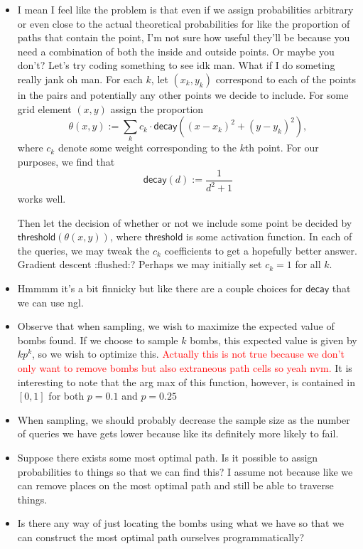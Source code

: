 \documentclass[a4paper, 12pt]{article}
\begin{document}
\begin{itemize}
    \item I mean I feel like the problem is that even if we assign probabilities arbitrary or even close to the actual theoretical probabilities for like the proportion of paths that contain the point, I'm not sure how useful they'll be because you need a combination of both the inside and outside points. Or maybe you don't? Let's try coding something to see idk man. What if I do someting really jank oh man. For each \( k \), let \( (x_k, y_k) \) correspond to each of the points in the pairs and potentially any other points we decide to include. For some grid element \( (x, y) \) assign the proportion
        \[
            \theta (x, y) := \sum_{k} c_k \cdot \textsf{decay}\left( (x - x_k)^2 + (y - y_k)^2 \right)
        ,\]
        where \( c_k \) denote some weight corresponding to the \( k \)th point. For our purposes, we find that
        \[
            \textsf{decay}(d) := \frac{1}{d^2 + 1}
        \]
        works well.
        
        Then let the decision of whether or not we include some point be decided by \( \textsf{threshold}( \theta (x, y)) \), where \( \textsf{threshold} \) is some activation function. In each of the queries, we may tweak the \( c_k \) coefficients to get a hopefully better answer. Gradient descent :flushed:? Perhaps we may initially set \( c_k = 1 \) for all \( k \).

    \item Hmmmm it's a bit finnicky but like there are a couple choices for \( \textsf{decay} \) that we can use ngl.

    \item Observe that when sampling, we wish to maximize the expected value of bombs found. If we choose to sample \( k \) bombs, this expected value is given by \( k p^k \), so we wish to optimize this. \textcolor{red}{Actually this is not true because we don't only want to remove bombs but also extraneous path cells so yeah nvm.} It is interesting to note that the arg max of this function, however, is contained in \( [0, 1] \) for both \( p = 0.1 \) and \( p = 0.25 \)

    \item When sampling, we should probably decrease the sample size as the number of queries we have gets lower because like its definitely more likely to fail.

    \item Suppose there exists some most optimal path. Is it possible to assign probabilities to things so that we can find this? I assume not because like we can remove places on the most optimal path and still be able to traverse things.

    \item Is there any way of just locating the bombs using what we have so that we can construct the most optimal path ourselves programmatically?
\end{itemize}
\end{document}
